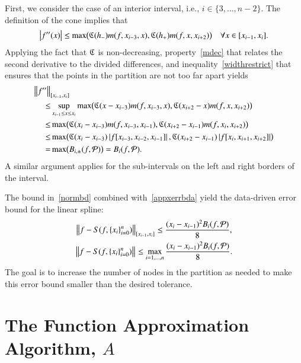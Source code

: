 \documentclass[review]{elsarticle}
\newcommand{\datasites}{\{x_i\}_{i=0}^n}
\theoremstyle{definition}
\begin{document}
First, we consider the case of an interior interval, i.e., $i \in \{3, \ldots, n-2\}$. The definition of the cone implies that
\begin{equation*}
\left \lvert f''(x) \right \rvert \le \max\bigl(\mathfrak{C}(h_-)m(f,x_{i-3},x),\mathfrak{C}(h_+)m(f,x,x_{i+2})\bigr)  \quad  \forall x \in [x_{i-1},x_i].
\end{equation*}
Applying the fact that $\mathfrak{C}$ is non-decreasing, property~\eqref{mdec} that relates the second derivative to the divided differences, and inequality~\eqref{widthrestrict} that ensures that the points in the partition are not too far apart yields
\begin{align*}
\nonumber
\MoveEqLeft{\norm[{[x_{i-1},x_i]}]{f''}}\\
\nonumber
 \le  & \sup_{x_{i-1} \le x \le x_i} \max\bigl(\fC(x-x_{i-3})m(f,x_{i-3},x),\fC(x_{i+2}-x)m(f,x,x_{i+2})\bigr)  \\
\nonumber
 \le  &  \max\bigl(\fC(x_{i}-x_{i-3})m(f,x_{i-3},x_{i-1}),\fC(x_{i+2}-x_{i-1})m(f,x_i,x_{i+2})\bigr) \\
\nonumber  \le & \max\bigl(\fC(x_{i}-x_{i-3})\abs{f[x_{i-3},x_{i-2},x_{i-1}]},\bigr.
 \fC(x_{i+2}-x_{i-1})\abs{f[x_i,x_{i+1},x_{i+2}]}\bigr) \\
 =  & \max\bigl(B_{i,\pm}(f,\cp)\bigr) = B_i(f,\cp).
\end{align*}
A similar argument applies for the sub-intervals on the left and right borders of the interval.

The bound in~\eqref{normbd} combined with~\eqref{appxerrbda} yield the
data-driven error bound for the linear spline:
\begin{subequations} \label{appxerrbdb}
\begin{gather}
\norm[{[x_{i-1},x_i]}]{f - S(f,\datasites)} \le \frac{(x_i - x_{i-1})^2 B_{i}(f,\cp)}{8} , \\
\norm{f - S(f,\datasites)} \le
\max_{i=1, \ldots, n} \frac{(x_i - x_{i-1})^2 B_{i}(f,\cp)}{8} .
\end{gather}
\end{subequations}
The goal is to increase the number of nodes in the partition as needed to make
this error bound smaller than the desired tolerance.

\section{The Function Approximation Algorithm, $A$}\label{sec:fappx}
\end{document}
